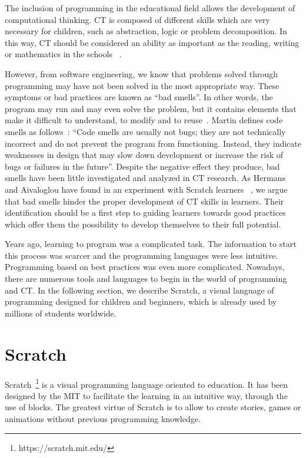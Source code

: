 The inclusion of programming in the educational field allows the development of computational thinking. CT is composed of different skills which are very necessary for children, such as abstraction, logic or problem decomposition. In this way, CT should be considered an ability as important as the reading, writing or mathematics in the schools ~\cite{calao:_design}.

However, from software engineering, we know that problems solved through programming may have not been solved in the most appropriate way. These symptoms or bad practices are known as ``bad smells''. In other words, the program may run and may even solve the problem, but it contains elements that make it difficult to understand, to modify and to reuse~\cite{zhang:_badsmells}. Martin defines code smells as follows~\cite{martin:_clean}: ``Code smells are usually not bugs; they are not technically incorrect and do not prevent the program from functioning. Instead, they indicate weaknesses in design that may slow down development or increase the risk of bugs or failures in the future''. Despite the negative effect they produce, bad smells have been little investigated and analyzed in CT research. As Hermans and Aivaloglou have found in an experiment with Scratch learners ~\cite{felienne:_hamper}, we argue that bad smells hinder the proper development of CT skills in learners. Their identification should be a first step to guiding learners towards good practices which offer them the possibility to develop themselves to their full potential.

Years ago, learning to program was a complicated task. The information to start this process was scarcer and the programming languages were less intuitive. Programming based on best practices was even more complicated. Nowadays, there are numerous tools and languages to begin in the world of programming and CT. In the following section, we describe Scratch, a visual language of programming designed for children and beginners, which is already used by millions of students worldwide.


\section{Scratch}
\label{sec:scratch}

Scratch~\footnote{https://scratch.mit.edu/} is a visual programming language oriented to education. It has been designed by the MIT to facilitate the learning in an intuitive way, through the use of blocks. The greatest virtue of Scratch is to allow to create stories, games or animations without previous programming knowledge.

